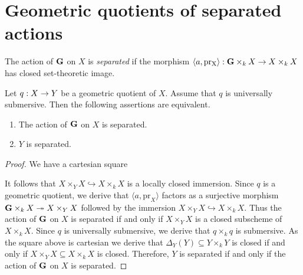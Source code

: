 \section{Geometric quotients of separated actions}

\begin{definition}
The action of $\mathbf{G}$ on $X$ is \textit{separated} if the morphism $\langle a, \mathrm{pr_X} \rangle:\mathbf{G}\times_kX\rightarrow X\times_kX$ has closed set-theoretic image.
\end{definition}

\begin{theorem}\label{theorem:separatedness_of_universally_submersive_geometric_quotients_of_separated_actions}
Let $q:X\rightarrow Y$ be a geometric quotient of $X$. Assume that $q$ is universally submersive. Then the following assertions are equivalent.
\begin{enumerate}[label=\emph{\textbf{(\roman*)}}, leftmargin=3.0em]
\item The action of $\mathbf{G}$ on $X$ is separated.
\item $Y$ is separated.
\end{enumerate}
\end{theorem}
\begin{proof}
We have a cartesian square
\begin{center}
\end{center}
It follows that $X\times_YX\hookrightarrow X\times_kX$ is a locally closed immersion. Since $q$ is a geometric quotient, we derive  that $\langle a, \mathrm{pr}_X \rangle$ factors as a surjective morphism $\mathbf{G} \times_k X\twoheadrightarrow X\times_YX$ followed by the immersion $X\times_YX\hookrightarrow X\times_kX$. Thus the action of $\mathbf{G}$ on $X$ is separated if and only if $X\times_YX$ is a closed subscheme of $X\times_kX$. Since $q$ is universally submersive, we derive that $q\times_kq$ is submersive. As the square above is cartesian we derive that $\Delta_Y(Y) \subseteq Y\times_kY$ is closed if and only if $X\times_YX\subseteq X\times_kX$ is closed. Therefore, $Y$ is separated if and only if the action of $\mathbf{G}$ on $X$ is separated.
\end{proof}

